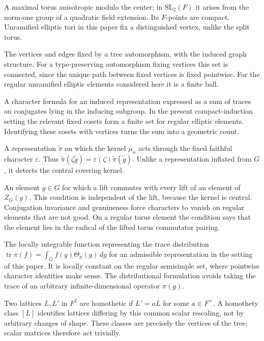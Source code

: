 \documentclass[12pt, letterpaper]{article}
\numberwithin{equation}{section}
\theoremstyle{definition}
\theoremstyle{remark}
\newcommand{\tr}{\operatorname{tr}}
\begin{document}
\begin{description}[style=nextline,leftmargin=1.5em,itemsep=5pt]
 \item[Elliptic torus] A maximal torus anisotropic modulo the center; in $\mathrm{SL}_2(F)$ it arises from the norm-one group of a quadratic field extension. Its $F$-points are compact. Unramified elliptic tori in this paper fix a distinguished vertex, unlike the split torus.
 \item[Fixed subtree] The vertices and edges fixed by a tree automorphism, with the induced graph structure. For a type-preserving automorphism fixing vertices this set is connected, since the unique path between fixed vertices is fixed pointwise. For the regular unramified elliptic elements considered here it is a finite ball.
 \item[Frobenius character sum] A character formula for an induced representation expressed as a sum of traces on conjugates lying in the inducing subgroup. In the present compact-induction setting the relevant fixed cosets form a finite set for regular elliptic elements. Identifying these cosets with vertices turns the sum into a geometric count.
 \item[Genuine representation] A representation $\widetilde\pi$ on which the kernel $\mu_n$ acts through the fixed faithful character $\varepsilon$. Thus $\widetilde\pi(\zeta\widetilde g)=\varepsilon(\zeta)\widetilde\pi(\widetilde g)$. Unlike a representation inflated from $G$, it detects the central covering kernel.
 \item[Good element of a covering group] An element $g\in G$ for which a lift commutes with every lift of an element of $Z_G(g)$. This condition is independent of the lift, because the kernel is central. Conjugation invariance and genuineness force characters to vanish on regular elements that are not good. On a regular torus element the condition says that the element lies in the radical of the lifted torus commutator pairing.
 \item[Harish-Chandra character ($Theta_pi$)] The locally integrable function representing the trace distribution $\tr\pi(f)=\int_G f(g)\Theta_\pi(g)\,dg$ for an admissible representation in the setting of this paper. It is locally constant on the regular semisimple set, where pointwise character identities make sense. The distributional formulation avoids taking the trace of an arbitrary infinite-dimensional operator $\pi(g)$.
 \item[Homothety and homothety class] Two lattices $L,L'$ in $F^2$ are homothetic if $L'=aL$ for some $a\in F^\times$. A homothety class $[L]$ identifies lattices differing by this common scalar rescaling, not by arbitrary changes of shape. These classes are precisely the vertices of the tree; scalar matrices therefore act trivially.

\end{description}
\end{document}
